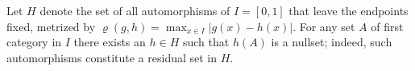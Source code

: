 Let $H$ denote the set of all automorphisms of $I = [0,1]$ that leave the endpoints fixed, metrized by $\varrho(g, h) = \max_{x \in I} |g(x) - h(x)|$. For any set $A$ of first category in $I$ there exists an $h \in H$ such that $h(A)$ is a nullset; indeed, such automorphisms constitute a residual set in $H$.
